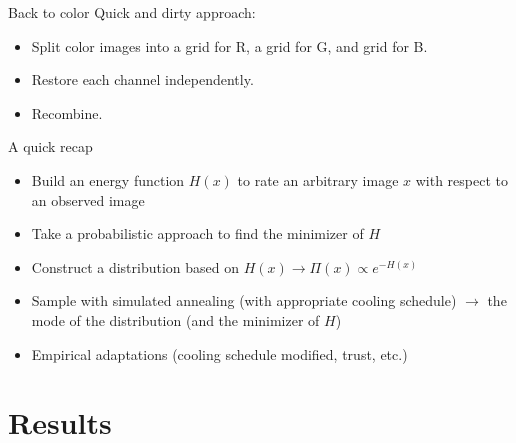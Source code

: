 \documentclass[10pt]{beamer}
\begin{document}
\begin{frame}{Back to color}
Quick and dirty approach:
\begin{itemize}
\item Split color images into a grid for R, a grid for G, and  grid for B.
\item Restore each channel independently.
\item Recombine.
\end{itemize} 
\end{frame}

\begin{frame}{A quick recap}
\begin{block}{}
\begin{itemize}
\pause \item Build an energy function $H(x)$ to rate an arbitrary image $x$ with respect to an observed image
\pause \item Take a probabilistic approach to find the minimizer of $H$
\pause \item Construct a distribution based on $H(x) \rightarrow \Pi(x) \propto e^{-H(x)}$ 
\pause \item Sample with simulated annealing (with appropriate cooling schedule) $\rightarrow$ the mode of the distribution (and the minimizer of $H$)
\pause \item Empirical adaptations (cooling schedule modified, trust, etc.)
\end{itemize}
\end{block}
\end{frame}


\section{Results}
\end{document}
